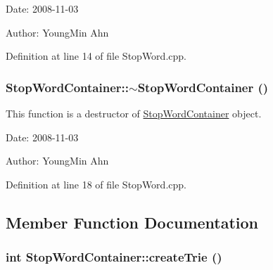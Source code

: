 \begin{Desc}
\item[Date:]2008-11-03 \end{Desc}
\begin{Desc}
\item[Author:]YoungMin Ahn \end{Desc}


Definition at line 14 of file StopWord.cpp.\hypertarget{classkmaOrange_1_1StopWordContainer_853fda3c028335f2529c57e0341f22fd}{
\subsubsection[{$\sim$StopWordContainer}]{\setlength{\rightskip}{0pt plus 5cm}StopWordContainer::$\sim$StopWordContainer ()}}
\label{classkmaOrange_1_1StopWordContainer_853fda3c028335f2529c57e0341f22fd}


This function is a destructor of \hyperlink{classkmaOrange_1_1StopWordContainer}{StopWordContainer} object. 

\begin{Desc}
\item[Date:]2008-11-03 \end{Desc}
\begin{Desc}
\item[Author:]YoungMin Ahn \end{Desc}


Definition at line 18 of file StopWord.cpp.

\subsection{Member Function Documentation}
\hypertarget{classkmaOrange_1_1StopWordContainer_143f32eb2e3b314d596cbd30f7ed6cfd}{
\subsubsection[{createTrie}]{\setlength{\rightskip}{0pt plus 5cm}int StopWordContainer::createTrie ()}}
\label{classkmaOrange_1_1StopWordContainer_143f32eb2e3b314d596cbd30f7ed6cfd}


